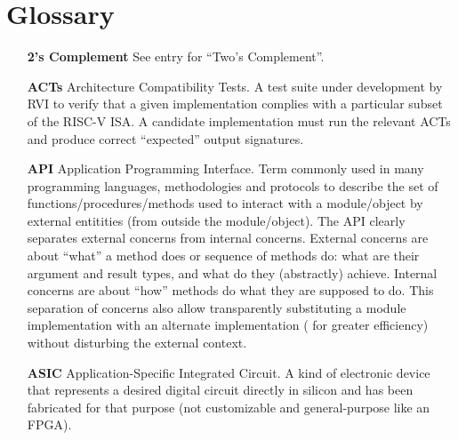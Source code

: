 

\chapter{Glossary}


\setcounter{page}{1}
\renewcommand{\thepage}{\Alph{chapter}-\arabic{page}}

\label{apx_Glossary}


\begin{itemize}

\item[\bf 2's Complement] See entry for ``Two's Complement''.

\item[\bf ACTs] Architecture Compatibility Tests.  A test suite under
  development by RVI to verify that a given implementation complies
  with a particular subset of the RISC-V ISA.  A candidate
  implementation must run the relevant ACTs and produce correct
  ``expected'' output signatures.

\item[\bf API] Application Programming Interface.  Term commonly used
  in many programming languages, methodologies and protocols to
  describe the set of functions/procedures/methods used to interact
  with a module/object by external entitities (from outside the
  module/object).  The API clearly separates external concerns from
  internal concerns.  External concerns are about ``what'' a method
  does or sequence of methods do: what are their argument and result
  types, and what do they (abstractly) achieve.  Internal concerns are
  about ``how'' methods do what they are supposed to do.  This
  separation of concerns also allow transparently substituting a
  module implementation with an alternate implementation ({\eg} for
  greater efficiency) without disturbing the external context.

\item[\bf ASIC] Application-Specific Integrated Circuit. A kind of
  electronic device that represents a desired digital circuit directly
  in silicon and has been fabricated for that purpose (not
  customizable and general-purpose like an FPGA).


\end{itemize}
